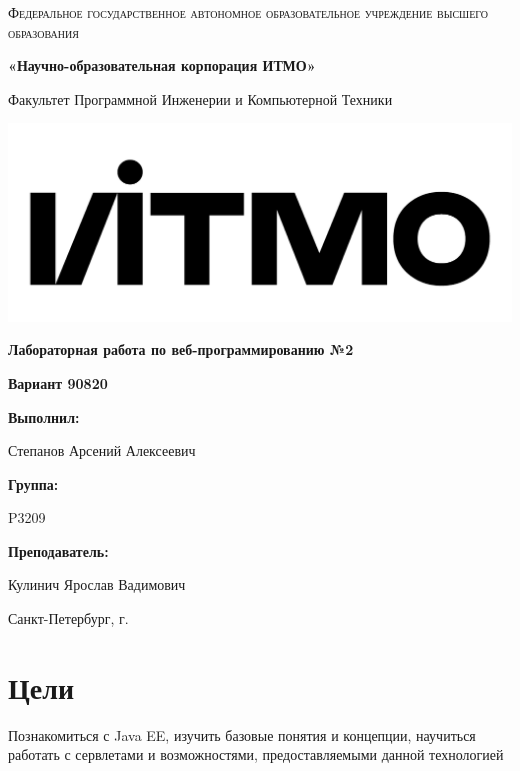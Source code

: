 \documentclass[12pt,a4paper]{report}
\begin{document}
\begin{titlepage} 
	\centering
	{
        \scshape
        Федеральное государственное автономное образовательное учреждение высшего образования
        \par
        \textbf{«Научно-образовательная корпорация ИТМО»}
        \par
        \vspace*{1cm}
        Факультет Программной Инженерии и Компьютерной Техники
        \par
    }
    \vspace*{0.6cm}
    \includegraphics[width=\textwidth]{logo.png}
    {
        \Large
        \textbf{Лабораторная работа по веб-программированию №2}
        \par
        \normalsize
        \vspace*{0.75cm}
        \textbf{Вариант 90820}
        \par
    }
    \vfill
    \hfill\begin{minipage}{\dimexpr\textwidth-7.8cm}
        \textbf{Выполнил:}\par
        Степанов Арсений Алексеевич\par
        \vspace*{0.15cm}
        \textbf{Группа:}\par
        P3209\par
        \vspace*{0.15cm}
        \textbf{Преподаватель:}\par
        Кулинич Ярослав Вадимович\par
    \end{minipage}
    \vfill
    Санкт-Петербург, \the\year{}г.
\end{titlepage}  
\section*{Цели}
Познакомиться с Java EE, изучить базовые понятия и концепции, научиться работать с сервлетами и возможностями, предоставляемыми данной технологией
\end{document}
